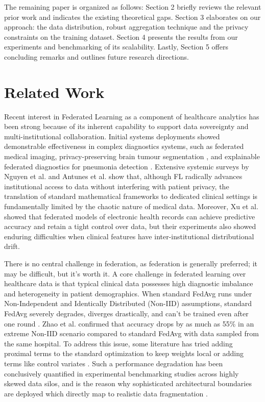 \documentclass[conference]{IEEEtran}
\begin{document}
The remaining paper is organized as follows: Section 2 briefly reviews the relevant prior work and indicates the existing theoretical gaps. Section 3 elaborates on our approach: the data distribution, robust aggregation technique and the privacy constraints on the training dataset. Section 4 presents the results from our experiments and benchmarking of its scalability. Lastly, Section 5 offers concluding remarks and outlines future research directions.

\section{Related Work}

Recent interest in Federated Learning as a component of healthcare analytics has been strong because of its inherent capability to support data sovereignty and multi-institutional collaboration. Initial systems deployments showed demonstrable effectiveness in complex diagnostics systems, such as federated medical imaging, privacy-preserving brain tumour segmentation \cite{rieke2020future, sheller2020brain}, and explainable federated diagnostics for pneumonia detection \cite{biswas2025flpnexainet}. Extensive systemic surveys by Nguyen et al. \cite{nguyen2022federated} and Antunes et al. \cite{antunes2022federated} show that, although FL radically advances institutional access to data without interfering with patient privacy, the translation of standard mathematical frameworks to dedicated clinical settings is fundamentally limited by the chaotic nature of medical data. Moreover, Xu et al. \cite{xu2021federated} showed that federated models of electronic health records can achieve predictive accuracy and retain a tight control over data, but their experiments also showed enduring difficulties when clinical features have inter-institutional distributional drift.

There is no central challenge in federation, as federation is generally preferred; it may be difficult, but it's worth it. A core challenge in federated learning over healthcare data is that typical clinical data possesses high diagnostic imbalance and heterogeneity in patient demographics. When standard FedAvg runs under Non-Independent and Identically Distributed (Non-IID) assumptions, standard FedAvg severely degrades, diverges drastically, and can't be trained even after one round \cite{fedavg_convergence}. Zhao et al. \cite{zhao2018federated} confirmed that accuracy drops by as much as 55\% in an extreme Non-IID scenario compared to standard FedAvg with data sampled from the same hospital. To address this issue, some literature has tried adding proximal terms to the standard optimization to keep weights local \cite{fedprox} or adding terms like control variates \cite{scaffold}. Such a performance degradation has been conclusively quantified in experimental benchmarking studies across highly skewed data silos, and is the reason why sophisticated architectural boundaries are deployed which directly map to realistic data fragmentation \cite{li2022federated, li2020federated_challenges}.
\end{document}
